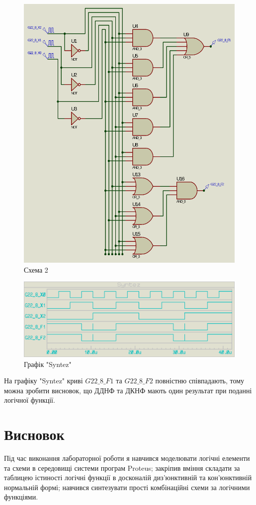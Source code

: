\documentclass{article}
\begin{document}
\begin{normalsize}
	\begin{figure}[H]
		\centering
		\includegraphics[scale=0.29]{s2}	
		\caption{Схема 2}
	\end{figure}
	\begin{figure}[H]
		\centering
		\includegraphics[scale=0.35]{g4}	
		\caption{Графік "Syntez"}
	\end{figure}	

	На графіку "Syntez" криві $G22\_8\_F1$ та $G22\_8\_F2$ повністню співпадають, тому можна зробити висновок, що ДДНФ та ДКНФ мають один результат при поданні логічної функції.

	\section*{Висновок}
	Під час виконання лабораторної роботи я навчився моделювати логічні елементи та схеми в середовищі системи програм Proteus; закріпив вміння складати за таблицею істиності логічні функції в досконалій диз'юнктивній та кон'юнктивній нормальній формі; навчився синтезувати прості комбінаційні схеми за логічними функціями.
	    
\end{normalsize}
\end{document}
